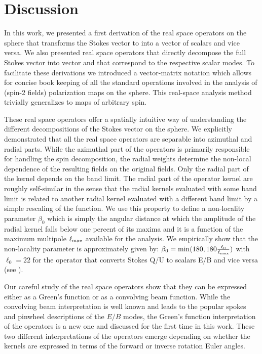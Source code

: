 \section{Discussion}\label{sec:discussion}
In this work, we presented a first derivation of the real space operators on the sphere that transforms the Stokes vector to into a vector of scalars and vice versa. We also presented real space operators that directly decompose the full Stokes vector \vp{} into vector  and  that correspond to the respective scalar modes.  To facilitate these derivations we introduced a vector-matrix notation which allows for concise book keeping of all the standard operations involved in the analysis of (spin-2 fields) polarization maps on the sphere. This real-space analysis method trivially generalizes to maps of arbitrary spin.


These real space operators offer a spatially intuitive way of understanding the different decompositions of the Stokes vector on the sphere. We explicitly  demonstrated that all the real space operators are separable into azimuthal and radial parts. While the azimuthal part of the operators is primarily responsible for handling the spin decomposition, the radial weights determine the non-local dependence of the resulting fields on the original fields.  Only the radial part of the kernel depends on the band limit. 
The radial part of the operator kernel are roughly self-similar in the sense that the radial kernels evaluated with some band limit is related to another radial kernel evaluated with a different band limit by a simple rescaling of the function. We use this property to define a non-locality parameter $\beta_0$ which is simply the angular distance at which the amplitude of the radial kernel falls below one percent of its maxima and it  is a function of the maximum multipole $\ell_{\rm max}$ available for the analysis. We empirically show that the non-locality parameter is approximately given by: $\beta_0 = \mathrm{min}(180, 180 \frac{\ell_{0}}{\ell_{\rm max}})$ with $\ell_{0}=22$ for the operator that converts Stokes Q/U to scalars E/B and vice versa (see ).  

Our careful study of the real space operators show that they can be expressed either as a Green's function or as a convolving beam function. While the convolving beam interpretation is well known and leads to the popular spokes and pinwheel descriptions of the $E/B$ modes, the Green's function interpretation of the operators is a new one and discussed for the first time in this work. These two different interpretations of the operators emerge depending on whether the kernels are expressed in terms of the forward or inverse rotation Euler angles.  


